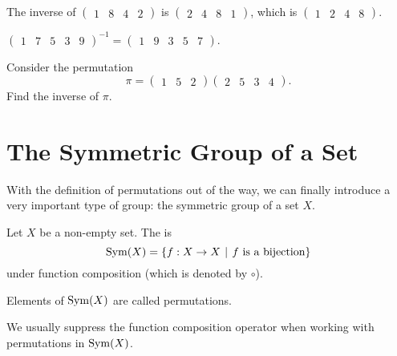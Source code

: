 \begin{example}
    The inverse of $\begin{pmatrix}1 & 8 & 4 & 2\end{pmatrix}$ is $\begin{pmatrix}2 & 4 & 8 & 1\end{pmatrix}$, which is $\begin{pmatrix}1 & 2 & 4 & 8\end{pmatrix}$.
\end{example}

\begin{example}
    $\begin{pmatrix}1 & 7 & 5 & 3 & 9\end{pmatrix}^{-1} = \begin{pmatrix}1 & 9 & 3 & 5 & 7\end{pmatrix}$.
\end{example}

\begin{exercise}
    Consider the permutation
    \[
        \pi = \begin{pmatrix}1 & 5 & 2\end{pmatrix}\begin{pmatrix}2 & 5 & 3 & 4\end{pmatrix}.
    \]
    Find the inverse of $\pi$.
\end{exercise}

\section{The Symmetric Group of a Set}
With the definition of permutations out of the way, we can finally introduce a very important type of group: the symmetric group of a set $X$.

\begin{definition}
    Let $X$ be a non-empty set. The  is
    \[
        \Sym{X} = \{f: X \to X \vert f \text{ is a bijection}\}
    \]
    under function composition (which is denoted by $\circ$).
\end{definition}
\begin{remark}
    Elements of $\mathrm{Sym}(X)$ are called permutations.
\end{remark}
\begin{remark}
    We usually suppress the function composition operator when working with permutations in $\mathrm{Sym}(X)$.
\end{remark}

